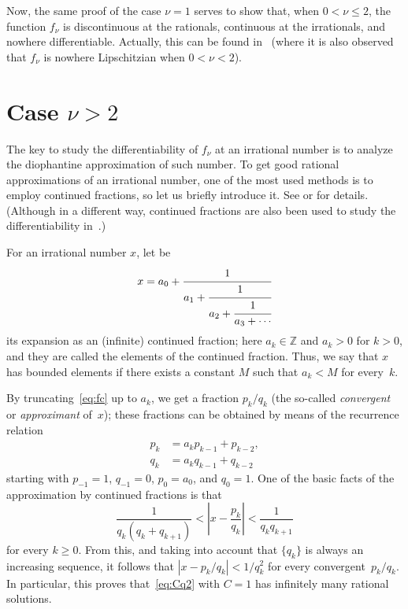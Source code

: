 \documentclass[11pt,a4paper,reqno]{amsart}
\def\Z{\mathbb{Z}}
\theoremstyle{plain}
\theoremstyle{definition}
\begin{document}
Now, the same proof of the case $\nu=1$ serves to show that, when $0 < \nu \le 2$, the function $f_\nu$ is discontinuous at the rationals, continuous at the irrationals, and nowhere differentiable.
Actually, this can be found in~\cite{He} (where it is also observed that $f_\nu$ is nowhere Lipschitzian when $0 < \nu < 2$).

\section{Case $\nu > 2$}

The key to study the differentiability of $f_\nu$ at an irrational number is to analyze the diophantine approximation of such number. To get good rational approximations of an irrational number, one of the most used methods is to employ continued fractions, so let us briefly introduce it.
See \cite{Khinchin} or \cite[Chapter~7]{MiTa} for details.
(Although in a different way, continued fractions are also been used to study the differentiability in~\cite{No}.)

For an irrational number $x$, let be
\begin{equation}
\label{eq:fc}
  x = a_0 + \cfrac{1}{a_1 + \cfrac{1}{a_2 + \cfrac{1}{a_3 + \cdots}}}
\end{equation}
its expansion as an (infinite) continued fraction; here $a_k \in \Z$ and $a_k > 0$ for $k>0$, and they are called the elements of the continued fraction. Thus, we say that $x$ has bounded elements if there exists a constant $M$ such that $a_k < M$ for every~$k$. 

By truncating~\eqref{eq:fc} up to $a_k$, we get a fraction $p_k/q_k$ (the so-called \textit{convergent} or \textit{approximant} of~$x$); these fractions can be obtained by means of the recurrence relation
\begin{align*}
  p_k &= a_k p_{k-1} + p_{k-2}, \\
  q_k &= a_k q_{k-1} + q_{k-2}
\end{align*}
starting with $p_{-1} = 1$, $q_{-1} = 0$, $p_{0} = a_0$, and $q_{0} = 1$.
One of the basic facts of the approximation by continued fractions is that
\begin{equation}
\label{eq:basic}
  \frac{1}{q_k(q_k+q_{k+1})}
  < \left| x - \frac{p_k}{q_k} \right| < \frac{1}{q_kq_{k+1}}
\end{equation}
for every $k \ge 0$. From this, and taking into account that $\{q_k\}$ is always an increasing sequence, it follows that $|x - {p_k}/{q_k}| < 1/{q_k^2}$ for every 
convergent~$p_k/q_k$. In particular, this proves that~\eqref{eq:Cq2} with $C=1$ has infinitely many rational solutions.
\end{document}
